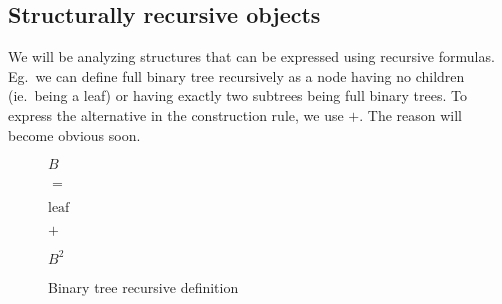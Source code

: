 \documentclass[final]{article}
\theoremstyle{definition}
\theoremstyle{remark}
\begin{document}
\subsection{Structurally recursive objects}%
\label{sub:structurally_recursive_objects}

We will be analyzing structures that can be expressed using recursive formulas. Eg.\ we can define full binary tree recursively as a node having no children (ie.\ being a leaf) or having exactly two subtrees being full binary trees. To express the alternative in the construction rule, we use \(+\). The reason will become obvious soon.

\begin{figure}[h]
    \begin{center}
        \begin{minipage}[t]{.2\textwidth}
            \begin{center}
                \(B\)\\
            \end{center}
        \end{minipage}%
        \begin{minipage}[t]{.05\textwidth}
            \begin{center}
                \(=\)\\
            \end{center}
        \end{minipage}%
        \begin{minipage}[t]{.2\textwidth}
            \begin{center}
                \(\text{leaf}\)\\
            \end{center}
        \end{minipage}%
        \begin{minipage}[t]{.05\textwidth}
            \begin{center}
                \(+\)\\
            \end{center}
        \end{minipage}%
        \begin{minipage}[t]{.2\textwidth}
            \begin{center}
                \(B^2\)\\
            \end{center}
        \end{minipage}%
    \end{center}
    \caption{Binary tree recursive definition}
    \label{fig:binary_recursion}
\end{figure}
\end{document}
